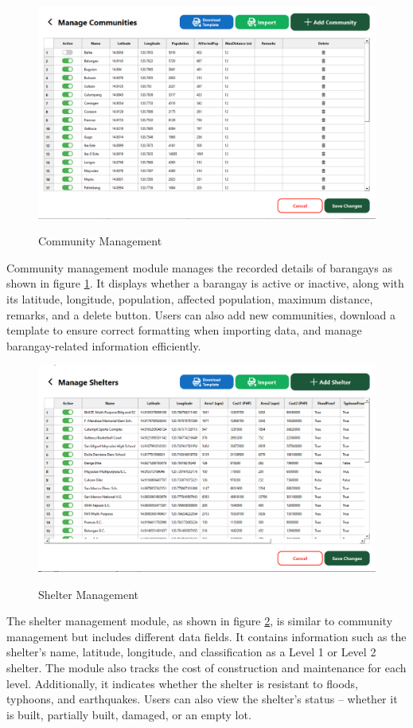 	\begin{figure}[h!]
		\caption{Community Management}
		\centering
		\includegraphics[width=4.5in]{Chapter 4/commadvanced}
		\label{commMan}
	\end{figure}
	Community management module manages the recorded details of barangays as shown in figure \ref{commMan}. It displays whether a barangay is active or inactive, along with its latitude, longitude, population, affected population, maximum distance, remarks, and a delete button. Users can also add new communities, download a template to ensure correct formatting when importing data, and manage barangay-related information efficiently.
	
	\begin{figure}[h!]
		\caption{Shelter Management}
		\centering
		\includegraphics[width=4.5in]{Chapter 4/sheladvanced}
		\label{shelMan}
	\end{figure}
	The shelter management module, as shown in figure \ref{shelMan}, is similar to community management but includes different data fields. It contains information such as the shelter’s name, latitude, longitude, and classification as a Level 1 or Level 2 shelter. The module also tracks the cost of construction and maintenance for each level. Additionally, it indicates whether the shelter is resistant to floods, typhoons, and earthquakes. Users can also view the shelter’s status – whether it is built, partially built, damaged, or an empty lot.
	
